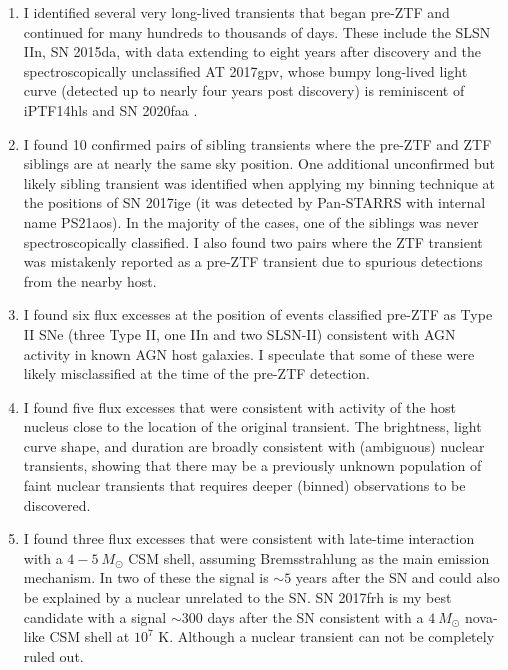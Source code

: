 \documentclass[a4paper,oneside,12pt, class=Latex/Classes/PhDthesisPSnPDF, crop=false]{standalone}
\begin{document}
\begin{enumerate}
    
    \item I identified several very long-lived transients that began pre-ZTF and continued for many hundreds to thousands of days. These include the SLSN IIn, SN 2015da, with data extending to eight years after discovery and the spectroscopically unclassified AT 2017gpv, whose bumpy long-lived light curve (detected up to nearly four years post discovery) is reminiscent of iPTF14hls \citep{iPTF14hls_Iair,Sollerman_2019_iptf14hls} and SN 2020faa \citep{Yang_2021_20faa, 2020faa_hidden_shocks}. 
    \item I found 10 confirmed pairs of sibling transients where the pre-ZTF and ZTF siblings are at nearly the same sky position. One additional unconfirmed but likely sibling transient was identified when applying my binning technique at the positions of SN 2017ige (it was detected by Pan-STARRS with internal name PS21aos). In the majority of the cases, one of the siblings was never spectroscopically classified. I also found two pairs where the ZTF transient was mistakenly reported as a pre-ZTF transient due to spurious detections from the nearby host.
    \item I found six flux excesses at the position of events classified pre-ZTF as Type II SNe (three Type II, one IIn and two SLSN-II) consistent with AGN activity in known AGN host galaxies. I speculate that some of these were likely misclassified at the time of the pre-ZTF detection.
    \item I found five flux excesses that were consistent with activity of the host nucleus close to the location of the original transient. The brightness, light curve shape, and duration are broadly consistent with (ambiguous) nuclear transients, showing that there may be a previously unknown population of faint nuclear transients that requires deeper (binned) observations to be discovered.
    \item I found three flux excesses that were consistent with late-time interaction with a $4 - 5\ M_\odot$ CSM shell, assuming Bremsstrahlung as the main emission mechanism. In two of these the signal is $\sim5$ years after the SN and could also be explained by a nuclear unrelated to the SN. SN 2017frh is my best candidate with a signal $\sim300$ days after the SN consistent with a $4\ M_\odot$ nova-like CSM shell at $10^7$ K. Although a nuclear transient can not be completely ruled out.
 \end{enumerate}
\end{document}
